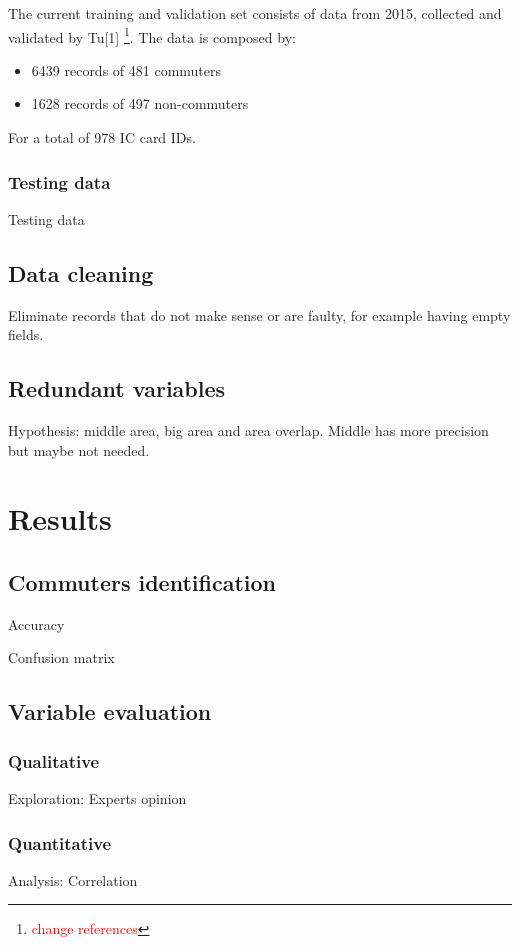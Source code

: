\documentclass{article}
\newcommand{\selfnote}[1]{\footnote{\textcolor{red}{#1}}}
\begin{document}
The current training and validation set consists of data from 2015, collected and validated by Tu[1] \selfnote{change references}. The data is composed by:

\begin{itemize}
\item 6439 records of 481 commuters
\item 1628 records of 497 non-commuters
\end{itemize}

For a total of 978 IC card IDs.

\subsubsection{Testing data}
Testing data

\subsection{Data cleaning}
Eliminate records that do not make sense or are faulty, for example having empty fields. 

\subsection{Redundant variables}
Hypothesis: middle area, big area and area overlap. Middle has more precision but maybe not needed.

\section{Results}
\subsection{Commuters identification}
Accuracy

Confusion matrix

\subsection{Variable evaluation}
\subsubsection{Qualitative}
Exploration: Experts opinion

\subsubsection{Quantitative}
Analysis: Correlation
\end{document}
